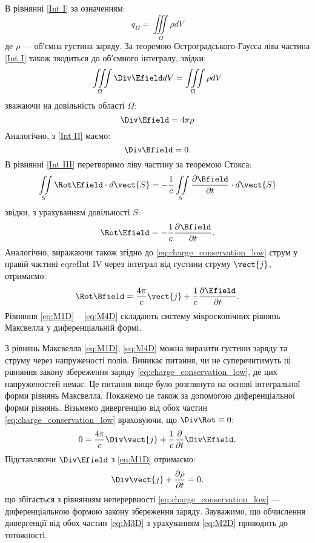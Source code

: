 В рівнянні \eqref{Int I} за означенням:
\begin{equation}
    q_{\Omega} = \iiint\limits_{\Omega} \rho dV
\end{equation}
де $\rho$ ---  об′ємна густина заряду. За теоремою Остроградського-Гаусса ліва частина \eqref{Int I} також зводиться до об′ємного інтегралу, звідки:
\begin{equation*}
     \iiint\limits_{\Omega} \Div\Efield dV = \iiint\limits_{\Omega} \rho dV
\end{equation*}
зважаючи на довільність області $\Omega$:
\begin{equation}\label{eq:M1D}
    \Div\Efield = 4\pi\rho
\end{equation}
Аналогічно, з \eqref{Int II} маємо:
\begin{equation}\label{eq:M2D}
    \Div\Bfield = 0.
\end{equation}
В рівнянні \eqref{Int III} перетворимо ліву частину за теоремою Стокса:
\begin{equation*}
    \iint\limits_{S} \Rot\Efield\cdot d\vect{S} = - \frac1c \iint\limits_S \frac{\partial\Bfield}{\partial t}\cdot d\vect{S}
\end{equation*}
звідки, з урахуванням довільності $S$:
\begin{equation}\label{eq:M3D}
    \Rot\Efield = - \frac1c \frac{\partial\Bfield}{\partial t}.
\end{equation}
Аналогічно, виражаючи також згідно до \eqref{eq:charge_conservation_low} струм у правій частині
eqref{Int IV}  через інтеграл від густини струму $\vect{j}$, отримаємо:
\begin{equation}\label{eq:M4D}
    \Rot\Bfield = \frac{4\pi}c\vect{j} + \frac1c \frac{\partial\Efield}{\partial t}.
\end{equation}
Рівняння \eqref{eq:M1D} -- \eqref{eq:M4D} складають систему мікроскопічних рівнянь
Максвелла у диференціальній формі.

З рівнянь Максвелла \eqref{eq:M1D}, \eqref{eq:M4D} можна виразити густини заряду та
струму через напруженості полів. Виникає питання, чи не суперечитимуть ці
рівняння закону збереження заряду \eqref{eq:charge_conservation_low}, де цих напруженостей немає. Це
питання вище було розглянуто на основі інтегральної форми рівнянь
Максвелла. Покажемо це також за допомогою диференціальної форми рівнянь.
Візьмемо дивергенцію від обох частин \eqref{eq:charge_conservation_low} враховуючи, що $\Div\Rot\equiv0$:
\begin{equation*}
    0 = \frac{4\pi}c\Div\vect{j} + \frac1c \frac{\partial}{\partial t} \Div\Efield.
\end{equation*}
Підставляючи $\Div\Efield$ з \eqref{eq:M1D} отримаємо:
\begin{equation*}
    \Div\vect{j} + \frac{\partial\rho}{\partial t} = 0.
\end{equation*}
що збігається з рівнянням неперервності \eqref{eq:charge_conservation_low} --- диференціальною формою
закону збереження заряду.
Зауважимо, що обчислення дивергенції від обох частин \eqref{eq:M3D} з
урахуванням \eqref{eq:M2D} приводить до тотожності.


